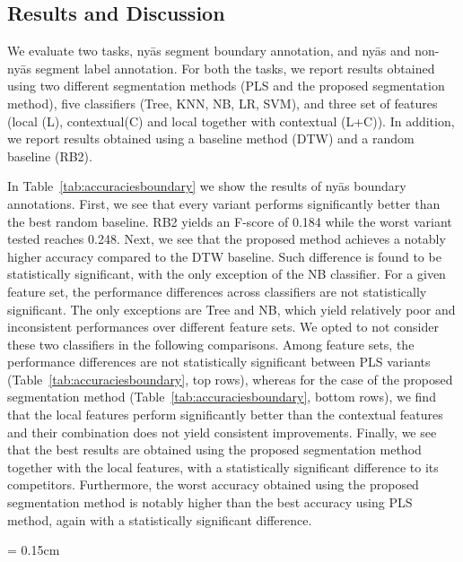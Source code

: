 {{\subsection{Results and Discussion}
\label{ResultsAndDiscussion}


We evaluate two tasks, ny\={a}s segment boundary annotation, and ny\={a}s and non-ny\={a}s segment label annotation. For both the tasks, we report results obtained using two different segmentation methods (PLS and the proposed segmentation method), five classifiers (Tree, KNN, NB, LR, SVM), and three set of features (local (L), contextual(C) and local together with contextual (L+C)). In addition, we report results obtained using a baseline method (DTW) and a random baseline (RB2).


In Table~\ref{tab:accuraciesboundary} we show the results of ny\={a}s boundary annotations. First, we see that every variant performs significantly better than the best random baseline. RB2 yields an F-score of 0.184 while the worst variant tested reaches 0.248. Next, we see that the proposed method achieves a notably higher accuracy compared to the DTW baseline. Such difference is found to be statistically significant, with the only exception of the NB classifier. For a given feature set, the performance differences across classifiers are not statistically significant. The only exceptions are Tree and NB, which yield relatively poor and inconsistent performances over different feature sets. We opted to not consider these two classifiers in the following comparisons. Among  feature sets, the performance differences are not statistically significant between PLS variants (Table~\ref{tab:accuraciesboundary}, top rows), whereas for the case of the proposed segmentation method (Table~\ref{tab:accuraciesboundary}, bottom rows), we find that the local features perform significantly better than the contextual features and their combination does not yield consistent improvements. Finally, we see that the best results are obtained using the proposed segmentation method together with the local features, with a statistically significant difference to its competitors. Furthermore, the worst accuracy obtained using the proposed segmentation method is notably higher than the best accuracy using PLS method, again with a statistically significant difference.


\begin{table} 
	\centering
	\tabcolsep = 0.15cm
	\renewcommand{\arraystretch}{1.15}
	\begin{tabular}{ c|c|c| c c c c c c }
		

\end{tabular}
\end{table}}}
